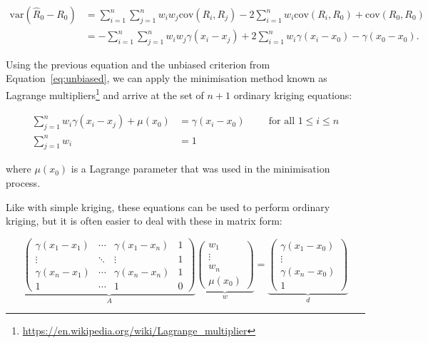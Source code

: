 \begin{align}
\mathrm{var}\left(\hat{R}_0 - R_0\right) &= \sum_{i=1}^n \sum_{j=1}^n w_i w_j \mathrm{cov}(R_i, R_j) - 2\sum_{i=1}^n w_i \mathrm{cov}(R_i,R_0) + \mathrm{cov}(R_0, R_0) \nonumber \\
&= -\sum_{i=1}^n \sum_{j=1}^n w_i w_j \gamma(x_i-x_j) + 2\sum_{i=1}^n w_i \gamma(x_i-x_0) - \gamma(x_0-x_0).
\end{align}

Using the previous equation and the unbiased criterion from Equation~\ref{eq:unbiased}, we can apply the minimisation method known as Lagrange multipliers\footnote{\url{https://en.wikipedia.org/wiki/Lagrange_multiplier}} and arrive at the set of \(n+1\) ordinary kriging equations:

\begin{align}
\sum_{j=1}^n w_i \gamma(x_i-x_j) + \mu(x_0) &= \gamma(x_i - x_0) \hspace{1cm} \text{for all } 1 \leq i \leq n \nonumber \\
\sum_{j=1}^n w_i &= 1 
\end{align}

where \(\mu(x_0)\) is a Lagrange parameter that was used in the minimisation process.

Like with simple kriging, these equations can be used to perform ordinary kriging, but it is often easier to deal with these in matrix form:

\begin{equation}
%
\underbrace{\left( \begin{array}{cccc}
\gamma(x_1-x_1) & \cdots & \gamma(x_1-x_n) & 1 \\
\vdots & \ddots & \vdots & 1 \\
\gamma(x_n-x_1) & \cdots & \gamma(x_n-x_n) & 1 \\
1 & \cdots & 1 & 0 \end{array} \right)}_{A}
%
\underbrace{\left(\begin{array}{c}
w_1 \\
\vdots \\
w_n \\
\mu(x_0) \end{array} \right)}_{w} = 
%
\underbrace{\left(\begin{array}{c}
\gamma(x_1-x_0) \\
\vdots \\
\gamma(x_n-x_0) \\
1 \end{array} \right)}_{d}
\end{equation}


